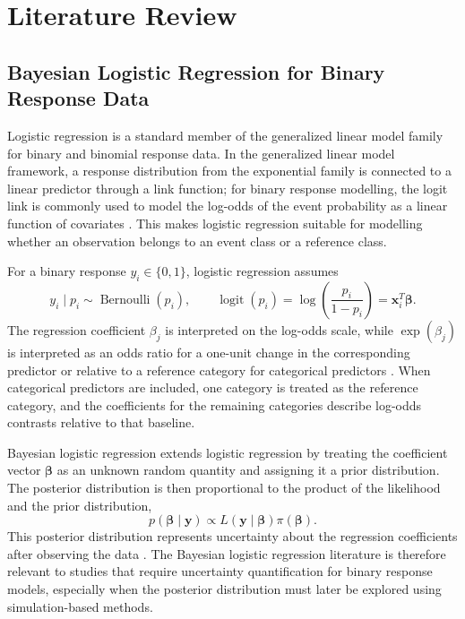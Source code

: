 \chapter{Literature Review}

\section{Bayesian Logistic Regression for Binary Response Data}

Logistic regression is a standard member of the generalized linear model family for binary and binomial response data. In the generalized linear model framework, a response distribution from the exponential family is connected to a linear predictor through a link function; for binary response modelling, the logit link is commonly used to model the log-odds of the event probability as a linear function of covariates \cite{mccullagh1989generalized,hosmer2013applied}. This makes logistic regression suitable for modelling whether an observation belongs to an event class or a reference class.

For a binary response $y_i\in\{0,1\}$, logistic regression assumes
\[
y_i\mid p_i \sim \operatorname{Bernoulli}(p_i),
\qquad
\operatorname{logit}(p_i)
=
\log\left(\frac{p_i}{1-p_i}\right)
=
\mathbf{x}_i^T\boldsymbol{\beta}.
\]
The regression coefficient $\beta_j$ is interpreted on the log-odds scale, while $\exp(\beta_j)$ is interpreted as an odds ratio for a one-unit change in the corresponding predictor or relative to a reference category for categorical predictors \cite{hosmer2013applied}. When categorical predictors are included, one category is treated as the reference category, and the coefficients for the remaining categories describe log-odds contrasts relative to that baseline.

Bayesian logistic regression extends logistic regression by treating the coefficient vector $\boldsymbol{\beta}$ as an unknown random quantity and assigning it a prior distribution. The posterior distribution is then proportional to the product of the likelihood and the prior distribution,
\[
p(\boldsymbol{\beta}\mid \mathbf{y})
\propto
L(\mathbf{y}\mid \boldsymbol{\beta})\pi(\boldsymbol{\beta}).
\]
This posterior distribution represents uncertainty about the regression coefficients after observing the data \cite{gelman2013bayesian}. The Bayesian logistic regression literature is therefore relevant to studies that require uncertainty quantification for binary response models, especially when the posterior distribution must later be explored using simulation-based methods.

